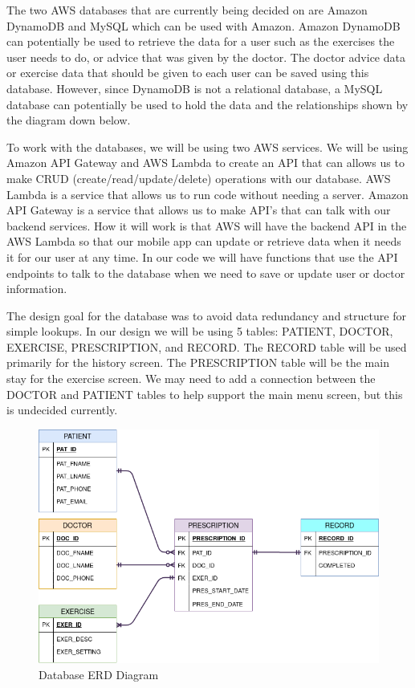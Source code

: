 \documentclass[a4paper,10pt]{article}
\begin{document}
	The two AWS databases that are currently being decided on are Amazon DynamoDB and MySQL which can be used with Amazon. Amazon DynamoDB can potentially be used to retrieve the data for a user such as the exercises the user needs to do, or advice that was given by the doctor. The doctor advice data or exercise data that should be given to each user can be saved using this database. However, since DynamoDB is not a relational database, a MySQL database can potentially be used to hold the data and the relationships shown by the diagram down below.
	
	To work with the databases, we will be using two AWS services. We will be using Amazon API Gateway and AWS Lambda to create an API that can allows us to make CRUD (create/read/update/delete) operations with our database. AWS Lambda is a service that allows us to run code without needing a server. Amazon API Gateway is a service that allows us to make API's that can talk with our backend services. How it will work is that AWS will have the backend API in the AWS Lambda so that our mobile app can update or retrieve data when it needs it for our user at any time. In our code we will have functions that use the API endpoints to talk to the database when we need to save or update user or doctor information. 

            
            The design goal for the database was to avoid data redundancy and structure for simple lookups. In our design we will be using 5 tables: PATIENT, DOCTOR, EXERCISE, PRESCRIPTION, and RECORD. The RECORD table will be used primarily for the history screen. The PRESCRIPTION table will be the main stay for the exercise screen. We may need to add a connection between the DOCTOR and PATIENT tables to help support the main menu screen, but this is undecided currently. 
            
            \begin{figure}[H]
            \centering
            \includegraphics[width=140mm, scale=1]{databaseDiagram}
            \caption{Database ERD Diagram}
            \end{figure}
            
\end{document}
